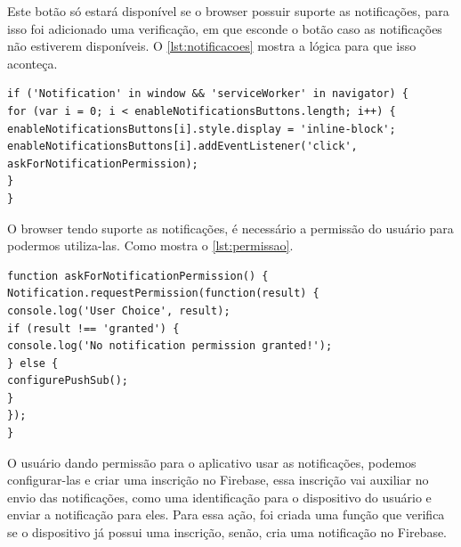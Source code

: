 Este botão só estará disponível se o browser possuir suporte as notificações, para isso foi adicionado uma verificação, em que esconde o botão caso as notificações não estiverem disponíveis. O \autoref{lst:notificacoes} mostra a lógica para que isso aconteça.

\begin{lstlisting}[frame=single,label=lst:notificacoes,caption=Verificando suporte notificações, basicstyle=\footnotesize]
if ('Notification' in window && 'serviceWorker' in navigator) {
for (var i = 0; i < enableNotificationsButtons.length; i++) {
enableNotificationsButtons[i].style.display = 'inline-block';
enableNotificationsButtons[i].addEventListener('click', askForNotificationPermission);
}
}
\end{lstlisting}
\vspace{-0.75cm}
\begin{center}
\end{center}

\newpage
O browser tendo suporte as notificações, é necessário a permissão do usuário para podermos utiliza-las. Como mostra o \autoref{lst:permissao}.

\begin{lstlisting}[frame=single,label=lst:permissao,caption=Pedindo permissão ao usuário, basicstyle=\footnotesize]
function askForNotificationPermission() {
Notification.requestPermission(function(result) {
console.log('User Choice', result);
if (result !== 'granted') {
console.log('No notification permission granted!');
} else {
configurePushSub();
}
});
}
\end{lstlisting}
\vspace{-0.75cm}
\begin{center}
\end{center}
O usuário dando permissão para o aplicativo usar as notificações, podemos configurar-las e criar uma inscrição no Firebase, essa inscrição vai auxiliar no envio das notificações, como uma identificação para o dispositivo do usuário e enviar a notificação para eles. Para essa ação, foi criada uma função que verifica se o dispositivo já possui uma inscrição, senão, cria uma notificação no Firebase.


